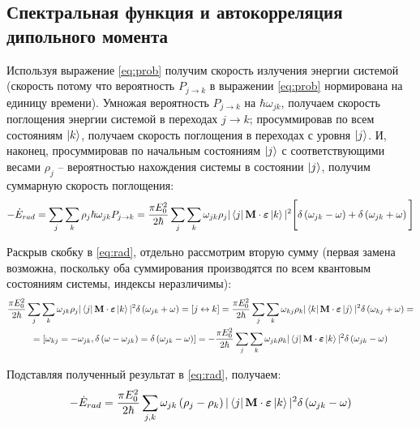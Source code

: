 \subsection{Спектральная функция и автокорреляция дипольного момента}

Используя выражение \ref{eq:prob} получим скорость излучения энергии системой (скорость потому что вероятность $P_{j \rightarrow k}$ в выражении \ref{eq:prob} нормирована на единицу времени). Умножая вероятность $P_{j \rightarrow k}$ на $\hbar \omega_{jk}$, получаем скорость поглощения энергии системой в переходах $j \rightarrow k$; просуммировав по всем состояниям $\ket{k}$, получаем скорость поглощения в переходах с уровня $\ket{j}$. И, наконец, просуммировав по начальным состояниям $\ket{j}$ с соответствующими весами $\rho_j$ -- вероятностью нахождения системы в состоянии $\ket{j}$, получим суммарную скорость поглощения:
\vverh
\begin{gather}
	- \dot{E}_{rad} = \sum_j \sum_k \rho_j \hbar \omega_{jk} P_{j \rightarrow k} = \frac{\pi E_0^2}{2 \hbar} \sum_j \sum_k \omega_{jk} \rho_j | \bra{j} \mathbf{M} \cdot \boldsymbol{\varepsilon} \ket{k} |^2 \Bigg[ \delta \left( \omega_{jk} - \omega \right) + \delta \left( \omega_{jk} + \omega \right) \Bigg] \label{eq:rad}
\end{gather}

Раскрыв скобку в \ref{eq:rad}, отдельно рассмотрим вторую сумму (первая замена возможна, поскольку оба суммирования производятся по всем квантовым состояниям системы, индексы неразличимы):
\vverh
\begin{gather}
	\frac{\pi E_0^2}{2 \hbar} \sum_j \sum_k \omega_{jk} \rho_j | \bra{j} \mathbf{M} \cdot \boldsymbol{\varepsilon} \ket{k} |^2 \delta \left( \omega_{jk} + \omega \right) = \left[ j \leftrightarrow k \right] = \frac{\pi E_0^2}{2 \hbar} \sum_j \sum_k \omega_{kj} \rho_k | \bra{k} \mathbf{M} \cdot \boldsymbol{\varepsilon} \ket{j} |^2 \delta \left( \omega_{kj} + \omega \right) = \notag \\
	= \left[ \omega_{kj} = - \omega_{jk}, \delta \left( \omega - \omega_{jk} \right) = \delta \left( \omega_{jk} - \omega \right) \right] = - \frac{\pi E_0^2}{2 \hbar} \sum_j \sum_k \omega_{jk} \rho_k | \bra{j} \mathbf{M} \cdot \boldsymbol{\varepsilon} \ket{k} |^2 \delta \left( \omega_{jk} - \omega \right) \notag
\end{gather}

Подставляя полученный результат в \ref{eq:rad}, получаем:
\vverh
\begin{gather}
	- \dot{E}_{rad} = \frac{\pi E_0^2}{2 \hbar} \sum_{j, k} \omega_{jk} \left( \rho_j - \rho_k \right) | \bra{j} \mathbf{M} \cdot \boldsymbol{\varepsilon} \ket{k} |^2 \delta \left( \omega_{jk} - \omega \right) \notag 
\end{gather}

